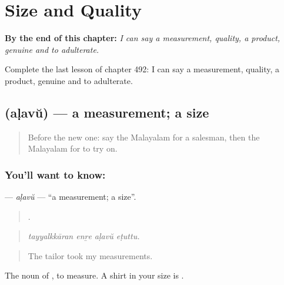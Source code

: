 
\chapter{Size and Quality}
\label{ch:ml-size-and-quality}

\begin{chapteropening}
\textbf{By the end of this chapter:} \emph{I can say a measurement, quality, a product, genuine and to adulterate.}

Complete the last lesson of chapter 492: I can say a measurement, quality, a product, genuine and to adulterate.
\end{chapteropening}

\section[\texorpdfstring{\ml{അളവ്} (aḷavŭ)}{അളവ് (aḷavŭ)}]{ (aḷavŭ) — a measurement; a size}

\label{lesson:ML-C492-alavu}



\begin{quote}
Before the new one: say the Malayalam for a salesman, then the Malayalam for to try on.
\end{quote}

\subsection*{You'll want to know: }
\textbf{} — \emph{aḷavŭ} — \textquotedblleft{}a measurement; a size\textquotedblright{}.

\begin{quote}
   .
\end{quote}

\begin{quote}
\emph{tayyalkkāran enṟe aḷavŭ eṭuttu.}
\end{quote}

\begin{quote}
The tailor took my measurements.
\end{quote}

The noun of , to measure. A shirt in your size is   .

